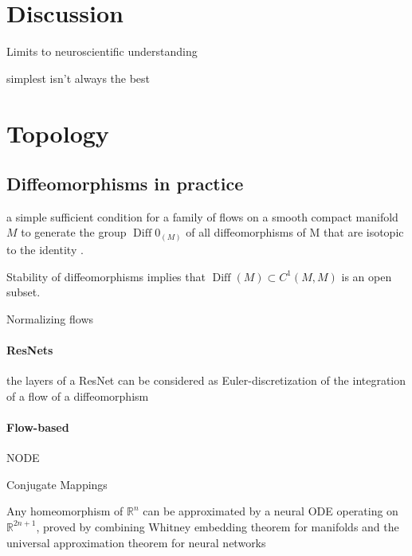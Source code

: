 \documentclass{article}
\theoremstyle{definition} \newtheorem{definition}{Definition}  \newtheorem{example}{Example}
\theoremstyle{remark} \newtheorem{remark}{Remark}
\newcommand{\Diff}{\operatorname{Diff}}
\newcounter{ct}
\begin{document}
\section{Discussion}

Limits to neuroscientific understanding \citep{chirimuuta2024brain}


simplest isn't always the best \citep{dyer2023simplest}




\newpage


\newpage
\appendix



\section{Topology}\label{sec:topology}


\subsection{Diffeomorphisms in practice}\label{sec:diffeomorphisms}

a simple sufficient condition for a family of flows on a smooth compact manifold $M$ to generate the group $\Diff0_(M)$ of all diffeomorphisms of M that are isotopic to the identity \citep{caponigro2010families}.

Stability of diffeomorphisms implies that $\Diff(M)\subset C^1(M,M)$  is an open subset.

Normalizing flows\citep{kobyzev2020normalizing}

\paragraph{ResNets}
the layers of a ResNet can be considered as Euler-discretization of the integration of a flow of a diffeomorphism\citep{rousseau2020residual}


\paragraph{Flow-based}
NODE\citep{finlay2020trainnode}

Conjugate Mappings \citep{bramburger2021conjugate}

Any homeomorphism of $\mathbb {R} ^{n}$ can be approximated by a neural ODE operating on $\mathbb {R} ^{2n+1}$, proved by combining Whitney embedding theorem for manifolds and the universal approximation theorem for neural networks  \citep{zhang2020approximation}
\end{document}
